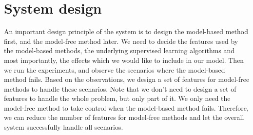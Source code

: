 

\section{System design}


An important design principle of the system is to design the model-based method first,
and the model-free method later. 
We need to decide the features used by the
model-based methods, the underlying supervised learning algorithms and most
importantly, the effects which we would like to include in our model. Then we
run the experiments, and observe the scenarios where the model-based method fails. 
Based on the observations, we design a set of features for model-free methods to handle
these scenarios. Note that we don't need to design a set of features to handle
the whole problem, but only part of it. We only need the model-free method
to take control when the model-based method fails. Therefore, we can reduce the
number of features for model-free methods and let the overall system
successfully handle all scenarios.


